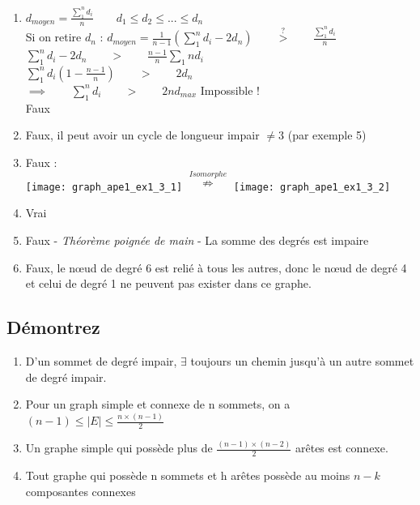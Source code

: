 \begin{solution}
  \begin{enumerate}
    \item{
        $d_{moyen} = \frac{\sum_{1}^{n} d_{i}}{n} \qquad d_{1} \leq d_{2} \leq ... \leq d_{n}$\\
        Si on retire $d_{n}$ :
        $d_{moyen} = \frac{1}{n-1}  (\sum_{1}^{n} d_{i} -2d_{n}) \qquad \stackrel{?}{>} \qquad \frac{\sum_{1}^{n}  d_{i}}{n}$\\
        $\sum_{1}^{n} d_{i} - 2d_{n} \qquad > \qquad \frac{n-1}{n} \sum_{1}{n} d_{i}$\\
        $\sum_{1}^{n} d_{i}(1- \frac{n-1}{n}) \qquad > \qquad 2d_{n}$\\
        $\implies \qquad \sum_{1}^{n} d_{i} \qquad > \qquad 2n d_{max}$ Impossible !\\
        Faux
      }
    \item{Faux, il peut avoir un cycle de longueur impair $\neq3$ (par exemple 5)}
    \item{Faux :\\
        \texttt{[image: graph\_ape1\_ex1\_3\_1]}
        $ \stackrel{Isomorphe}{\nRightarrow}$
        \texttt{[image: graph\_ape1\_ex1\_3\_2]}
      }
    \item{Vrai}
    \item{Faux - \textit{Théorème poignée de main} - La somme des degrés est impaire}
    \item{Faux, le nœud de degré 6 est relié à tous les autres, donc le nœud de degré 4 et celui de degré 1 ne peuvent pas exister dans ce graphe.}
  \end{enumerate}
\end{solution}

\subsection{Démontrez}
\begin{enumerate}
  \item{D'un sommet de degré impair, $\exists$ toujours un chemin jusqu'à un autre sommet de degré impair.}
  \item{Pour un graph simple et connexe de n sommets, on a $(n-1) \leq |E| \leq \frac{n \times (n-1)}{2}$}
  \item{Un graphe simple qui possède plus de $\frac{(n-1) \times (n-2)}{2}$ arêtes est connexe.}
  \item{Tout graphe qui possède n sommets et h arêtes possède au moins $n-k$ composantes connexes}
\end{enumerate}

